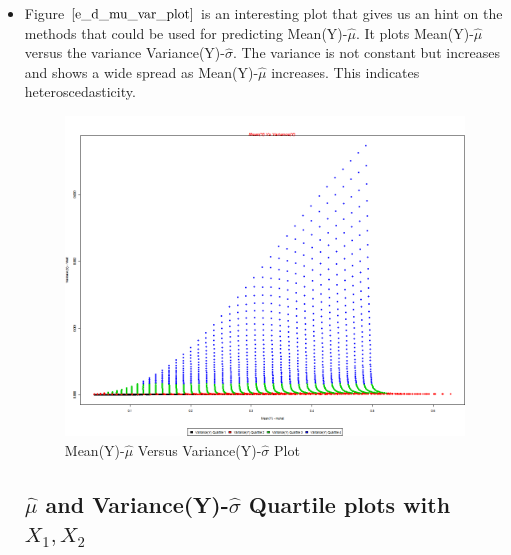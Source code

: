 \documentclass[twoside,12pt]{article}
\begin{document}
\begin{itemize}
\item
Figure $\eqref{e_d_mu_var_plot}$ is an interesting plot that gives us an hint on the methods that could be used for predicting Mean(Y)-$\hat{\mu}$. It plots Mean(Y)-$\hat{\mu}$ versus the variance Variance(Y)-$\hat{\sigma}$. The variance is not constant but increases and shows a wide spread as Mean(Y)-$\hat{\mu}$ increases. This indicates heteroscedasticity. 
\FloatBarrier
\begin{figure}[!htbp]
\centering
\includegraphics[scale=.50]{images/mt_matplot_mu_v_qt.png} 
\caption{ Mean(Y)-$\hat{\mu}$ Versus Variance(Y)-$\hat{\sigma}$ Plot}
\label{e_d_mu_var_plot}
\end{figure}
\FloatBarrier



\subsection{$\hat{\mu}$ and Variance(Y)-$\hat{\sigma}$ Quartile plots with $X_1,X_2$}


\end{itemize}
\end{document}
